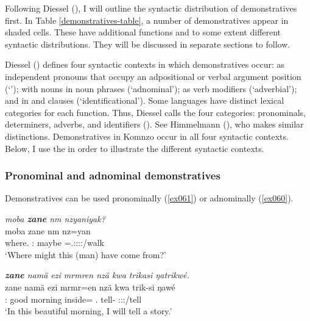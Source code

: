 Following Diessel (\citeyear{Diessel:2009tg}), I will outline the syntactic distribution of demonstratives first. In Table \ref{demonstratives-table}, a number of demonstratives appear in shaded cells. These have additional functions and to some extent different syntactic distributions. They will be discussed in separate sections to follow.%

Diessel (\citeyear{Diessel:2009tg}) defines four syntactic contexts in which demonstratives occur: as independent pronouns that occupy an adpositional or verbal argument position (`'); with nouns in noun phrases (`adnominal'); as verb modifiers (`adverbial'); and in  and  clauses (`identificational'). Some languages have distinct lexical categories for each function. Thus, Diessel calls the four categories:  pronominals,  determiners,  adverbs, and  identifiers (\citeyear[3]{Diessel:2009tg}). See Himmelmann (\citeyear{Himmelmann:1996tp}), who makes similar distinctions. Demonstratives in Komnzo occur in all four syntactic contexts. Below, I use the  in order to illustrate the different syntactic contexts.%

\subsubsection{Pronominal and adnominal demonstratives} \label{demprondet}

Demonstratives can be used pronominally (\ref{ex061}) or adnominally (\ref{ex060}).

\begin{exe}
	\ex \emph{moba \textbf{zane} nm nzyaniyak?}\\
	\gll moba zane nm nz=yan\\
	where.\Abl{} \Dem:\Prox{} maybe \Immpst=\Tsg.\Masc:\Sbj:\Nonpast:\Ipfv:\Venit/walk\\
	\trans `Where might this (man) have come from?'
	\label{ex061}
\end{exe}
\begin{exe}
	\ex \emph{\textbf{zane} namä ezi mrmren nzä kwa trikasi ŋatrikwé.}\\
	\gll zane namä ezi mrmr=en nzä kwa trik-si ŋawé\\
	\Dem:\Prox{} good morning inside=\Loc{} \Fsg.\Abs{} \Fut{} tell-\Nmlz{} \Fsg:\Sbj:\Nonpast:\Ipfv/tell\\
	\trans `In this beautiful morning, I will tell a story.'
	\label{ex060}
\end{exe}

